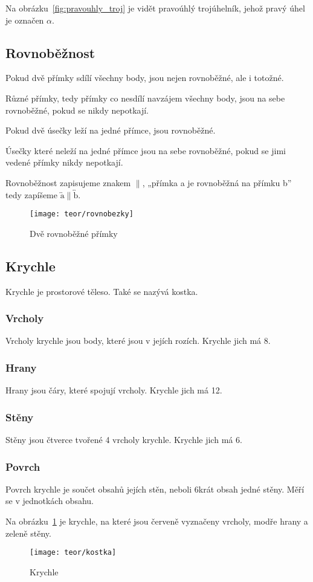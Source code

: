 Na obrázku~\ref{fig:pravouhly_troj} je vidět pravoúhlý trojúhelník, jehož pravý úhel je označen $\alpha$.

\subsection{Rovnoběžnost}
Pokud dvě přímky sdílí všechny body, jsou nejen rovnoběžné, ale i totožné.

Různé přímky, tedy přímky co nesdílí navzájem všechny body, jsou na sebe rovnoběžné, pokud se nikdy nepotkají.

Pokud dvě úsečky leží na jedné přímce, jsou rovnoběžné.

Úsečky které neleží na jedné přímce jsou na sebe rovnoběžné, pokud se jimi vedené přímky nikdy nepotkají.

Rovnoběžnost zapisujeme znakem $\|$, „přímka a je rovnoběžná na přímku b” tedy zapíšeme $\overleftrightarrow{\text{a}} \| \overleftrightarrow{\text{b}}$.
\begin{figure}[h]
    \centering
    \texttt{[image: teor/rovnobezky]}
    \caption{Dvě rovnoběžné přímky}
\end{figure}
\FloatBarrier

\subsection{Krychle}
Krychle je prostorové těleso. Také se nazývá kostka.

\subsubsection{Vrcholy}
Vrcholy krychle jsou body, které jsou v jejích rozích. Krychle jich má 8.

\subsubsection{Hrany}
Hrany jsou čáry, které spojují vrcholy. Krychle jich má 12.

\subsubsection{Stěny}
Stěny jsou čtverce tvořené 4 vrcholy krychle. Krychle jich má 6.

\subsubsection{Povrch}
Povrch krychle je součet obsahů jejích stěn, neboli 6krát obsah jedné stěny. Měří se v jednotkách obsahu.

Na obrázku~\ref{fig:krychle} je krychle, na které jsou červeně vyznačeny vrcholy, modře hrany a zeleně stěny.

\begin{figure}[h]
    \centering
    \texttt{[image: teor/kostka]}
    \caption{Krychle}
    \label{fig:krychle}
\end{figure}


